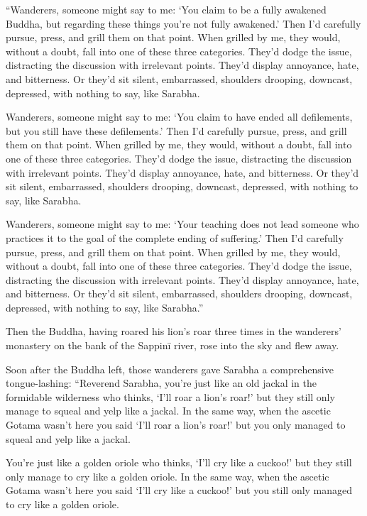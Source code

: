 \documentclass[12pt,openany]{book}%
\begin{document}
“Wanderers, someone might say to me: ‘You claim to be a fully awakened Buddha, but regarding these things you’re not fully awakened.’ Then I’d carefully pursue, press, and grill them on that point. When grilled by me, they would, without a doubt, fall into one of these three categories. They’d dodge the issue, distracting the discussion with irrelevant points. They’d display annoyance, hate, and bitterness. Or they’d sit silent, embarrassed, shoulders drooping, downcast, depressed, with nothing to say, like Sarabha. 

Wanderers, someone might say to me: ‘You claim to have ended all defilements, but you still have these defilements.’ Then I’d carefully pursue, press, and grill them on that point. When grilled by me, they would, without a doubt, fall into one of these three categories. They’d dodge the issue, distracting the discussion with irrelevant points. They’d display annoyance, hate, and bitterness. Or they’d sit silent, embarrassed, shoulders drooping, downcast, depressed, with nothing to say, like Sarabha. 

Wanderers, someone might say to me: ‘Your teaching does not lead someone who practices it to the goal of the complete ending of suffering.’ Then I’d carefully pursue, press, and grill them on that point. When grilled by me, they would, without a doubt, fall into one of these three categories. They’d dodge the issue, distracting the discussion with irrelevant points. They’d display annoyance, hate, and bitterness. Or they’d sit silent, embarrassed, shoulders drooping, downcast, depressed, with nothing to say, like Sarabha.” 

Then the Buddha, having roared his lion’s roar three times in the wanderers’ monastery on the bank of the \textsanskrit{Sappinī} river, rose into the sky and flew away. 

Soon after the Buddha left, those wanderers gave Sarabha a comprehensive tongue-lashing: “Reverend Sarabha, you’re just like an old jackal in the formidable wilderness who thinks, ‘I’ll roar a lion’s roar!’ but they still only manage to squeal and yelp like a jackal. In the same way, when the ascetic Gotama wasn’t here you said ‘I’ll roar a lion’s roar!’ but you only managed to squeal and yelp like a jackal. 

You’re just like a golden oriole who thinks, ‘I’ll cry like a cuckoo!’ but they still only manage to cry like a golden oriole. In the same way, when the ascetic Gotama wasn’t here you said ‘I’ll cry like a cuckoo!’ but you still only managed to cry like a golden oriole. 
\end{document}
